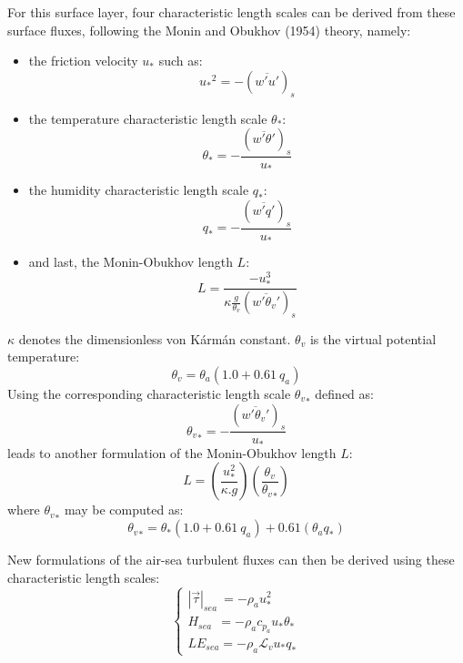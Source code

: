 For this surface layer, four characteristic length scales can be derived from these surface fluxes, following the Monin and Obukhov (1954) theory, namely:
\begin{itemize}
	\item the friction velocity $u_{*}$ such as:
\begin{equation}
	{u_{*}}^{2}=-(\overline{w'u'})_{s}
\label{eq_ustar2}\end{equation}
	\item the temperature characteristic length scale $\theta_{*}$:
\begin{equation}
	\theta_{*}=-\frac{(\overline{w'\theta '})_{s}}{u_{*}}
\label{eq_thetastar}\end{equation}
	\item the humidity characteristic length scale $q_{*}$:
\begin{equation}
	q_{*}=-\frac{(\overline{w'q'})_{s}}{u_{*}}
\label{eq_qstar}\end{equation}
	\item and last, the Monin-Obukhov length $L$:
\begin{equation}
	L=\frac{-u_{*}^{3}}{\kappa \frac{g}{{\theta}_v}\left(\overline{w'{{\theta}_v}'}\right)_s}
\label{eq_LMO}\end{equation}
\end{itemize}
$\kappa$ denotes the dimensionless von K\'arm\'an constant. ${\theta}_v$ is the virtual potential temperature:
\begin{equation}
	{\theta}_v={\theta}_a(1.0+0.61~q_a)
\label{eq_thetav}\end{equation}
Using the corresponding characteristic length scale ${{\theta}_v}_{*}$ defined as:
\begin{equation}
	{{\theta}_v}_{*}=-\frac{(\overline{w'{{\theta}_v}'})_{s}}{u_{*}}
\end{equation}
leads to another formulation of the Monin-Obukhov length $L$:
\begin{equation}
	L=\left(\frac{u_{*}^{2}}{\kappa.g}\right)\left(\frac{{\theta}_v}{{{\theta}_v}_{*}}\right)
\label{eq_LMObis}\end{equation}
where ${{\theta}_v}_{*}$ may be computed as:
\begin{equation}
	{{\theta}_v}_{*}=\theta_{*}(1.0+0.61~q_{a})+0.61(\theta_{a} q_{*})
\label{eq_thetavstar}\end{equation}

New formulations of the air-sea turbulent fluxes can then be derived using these characteristic length scales:
\begin{equation}
\left\{
\begin{array}{l}
	|\vec{\tau}|_{sea}~=-\rho_{a}u_{*}^{2} \\
	H_{sea}~~=-\rho_{a}c_{p_{a}}u_{*}\theta_{*}\\
	LE_{sea}=-\rho_{a}\mathcal{L}_{v}u_{*}q_{*}
\end{array}
\right.
\label{eq_charlength}\end{equation}


